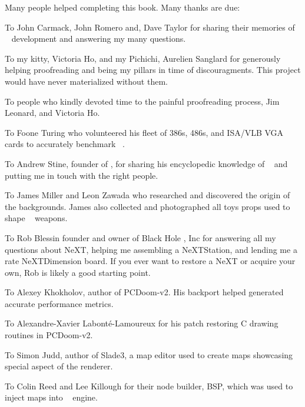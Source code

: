 Many people helped completing this book. Many thanks are due:\\
\par
To John Carmack, John Romero and, Dave Taylor for sharing their memories of \doom~ development and answering my many questions.\\
\par
To my kitty, Victoria Ho, and my Pichichi, Aurelien Sanglard for generously helping proofreading and being my pillars in time of discouragments. This project would have never materialized without them.\\ 
\par
To people who kindly devoted time to the painful proofreading process, Jim Leonard, and Victoria Ho.
\par
To Foone Turing who volunteered his fleet of 386s, 486s, and ISA/VLB VGA cards to accurately benchmark \doom~.\\
\par
To Andrew Stine, founder of , for sharing his encyclopedic knowledge of \doom~ and putting me in touch with the right people.\\
\par
To James Miller and Leon Zawada who researched and discovered the origin of the backgrounds. James also collected and photographed all toys props used to shape \doom~ weapons.\\
\par
To Rob Blessin founder and owner of Black Hole , Inc for answering all my questions about NeXT, helping me assembling a NeXTStation, and lending me a rate NeXTDimension board. If you ever want to restore a NeXT or acquire your own, Rob is likely a good starting point.\\
\par
To Alexey Khokholov, author of PCDoom-v2. His backport helped generated accurate performance metrics.\\
\par
To Alexandre-Xavier Labont\'e-Lamoureux for his patch restoring C drawing routines in PCDoom-v2.\\
\par
To Simon Judd, author of Slade3, a map editor used to create maps showcasing special aspect of the renderer.\\
\par
To Colin Reed and Lee Killough for their node builder, BSP, which was used to inject maps into \doom~ engine.\\
\par
